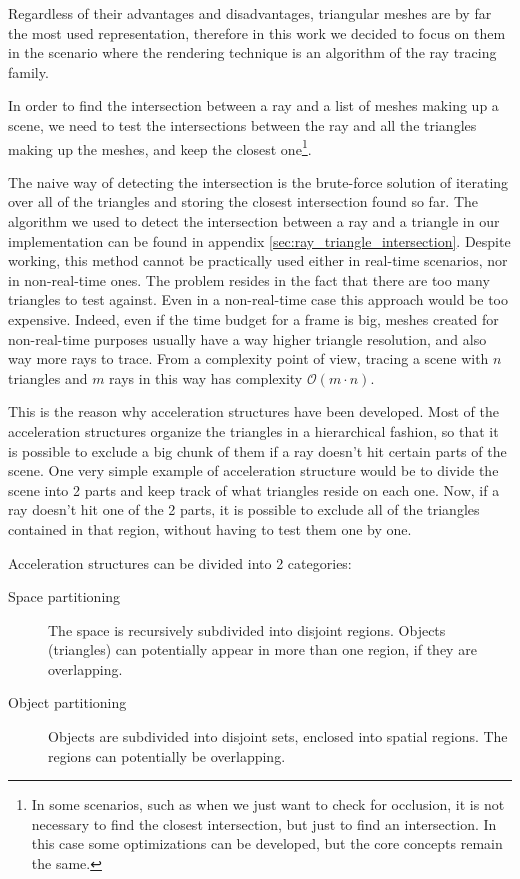 \documentclass{PoliMi_MasterThesis}
\begin{document}
Regardless of their advantages and disadvantages, triangular meshes are by far the most used representation, therefore in this work we decided to focus on them in the scenario where the rendering technique is an algorithm of the ray tracing family.

In order to find the intersection between a ray and a list of meshes making up a scene, we need to test the intersections between the ray and all the triangles making up the meshes, and keep the closest one\footnote{In some scenarios, such as when we just want to check for occlusion, it is not necessary to find the closest intersection, but just to find an intersection. In this case some optimizations can be developed, but the core concepts remain the same.}.

The naive way of detecting the intersection is the brute-force solution of iterating over all of the triangles and storing the closest intersection found so far. The algorithm we used to detect the intersection between a ray and a triangle in our implementation can be found in appendix \ref{sec:ray_triangle_intersection}. Despite working, this method cannot be practically used either in real-time scenarios, nor in non-real-time ones. The problem resides in the fact that there are too many triangles to test against. Even in a non-real-time case this approach would be too expensive. Indeed, even if the time budget for a frame is big, meshes created for non-real-time purposes usually have a way higher triangle resolution, and also way more rays to trace. From a complexity point of view, tracing a scene with $n$ triangles and $m$ rays in this way has complexity $\mathcal{O}(m\cdot n)$.

This is the reason why acceleration structures have been developed. Most of the acceleration structures organize the triangles in a hierarchical fashion, so that it is possible to exclude a big chunk of them if a ray doesn't hit certain parts of the scene. One very simple example of acceleration structure would be to divide the scene into 2 parts and keep track of what triangles reside on each one. Now, if a ray doesn't hit one of the 2 parts, it is possible to exclude all of the triangles contained in that region, without having to test them one by one.

Acceleration structures can be divided into 2 categories:
\begin{description}
	\item[Space partitioning] The space is recursively subdivided into disjoint regions. Objects (triangles) can potentially appear in more than one region, if they are overlapping. 
	\item[Object partitioning] Objects are subdivided into disjoint sets, enclosed into spatial regions. The regions can potentially be overlapping.  
\end{description}
\end{document}
